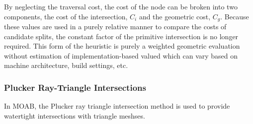 By neglecting the traversal cost, the cost of the node can be broken into two
components, the cost of the intersection, $C_{i}$ and the geometric cost,
$C_{g}$. Because these values are used in a purely relative manner to compare
the costs of candidate splits, the constant factor of the primitive intersection
is no longer required. This form of the heuristic is purely a weighted geometric
evaluation without estimation of implementation-based valued which can vary
based on machine architecture, build settings, etc.

\subsubsection{Plucker Ray-Triangle Intersections}\label{sec:intersection_distances}

In MOAB, the Plucker ray triangle intersection\cite{Platis_2003} method is used to provide
watertight intersections with triangle meshses.



